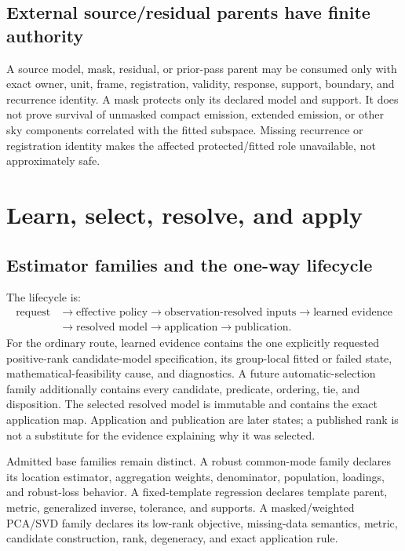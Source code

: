 \documentclass[11pt]{article}
\begin{document}
\subsection{External source/residual parents have finite authority}

A source model, mask, residual, or prior-pass parent may be consumed only
with exact owner, unit, frame, registration, validity, response, support,
boundary, and recurrence identity. A mask protects only its declared model
and support. It does not prove survival of unmasked compact emission,
extended emission, or other sky components correlated with the fitted
subspace. Missing recurrence or registration identity makes the affected
protected/fitted role unavailable, not approximately safe.

\section{Learn, select, resolve, and apply}
\label{sec:science-estimators}

\subsection{Estimator families and the one-way lifecycle}

The lifecycle is:
\[
\begin{aligned}
\text{request}&\rightarrow\text{effective policy}
\rightarrow\text{observation-resolved inputs}\rightarrow\text{learned evidence}\\
&\rightarrow\text{resolved model}\rightarrow\text{application}
\rightarrow\text{publication}.
\end{aligned}
\]
For the ordinary route, learned evidence contains the one explicitly
requested positive-rank candidate-model specification, its group-local fitted
or failed state, mathematical-feasibility cause, and diagnostics. A future
automatic-selection family additionally contains every candidate, predicate,
ordering, tie, and disposition.
The selected resolved model is immutable and contains the exact application
map. Application and publication are later states; a published rank is not a
substitute for the evidence explaining why it was selected.

Admitted base families remain distinct. A robust common-mode family declares
its location estimator, aggregation weights, denominator, population,
loadings, and robust-loss behavior. A fixed-template regression declares
template parent, metric, generalized inverse, tolerance, and supports. A
masked/weighted PCA/SVD family declares its low-rank objective, missing-data
semantics, metric, candidate construction, rank, degeneracy, and exact
application rule.
\end{document}
